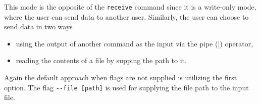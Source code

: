 This mode is the opposite of the \texttt{receive} command since it is a write-only mode, where the user can send data to another user. Similarly, the user can choose to send data in two ways
\begin{itemize}
  \item using the output of another command as the input via the pipe (|) operator,
  \item reading the contents of a file by supping the path to it.
\end{itemize}
Again the default approach when flags are not supplied is utilizing the first option. The flag \texttt{-\--file [path]} is used for supplying the file path to the input file.
